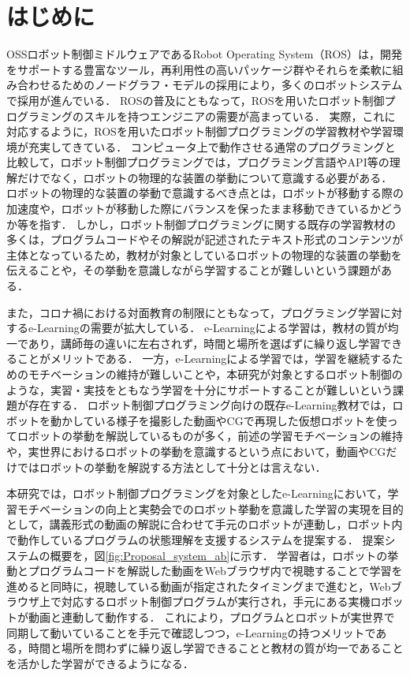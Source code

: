 \documentclass{ujarticle}
\begin{document}
\section{はじめに}%
OSSロボット制御ミドルウェアであるRobot Operating System（ROS）は，開発をサポートする豊富なツール，再利用性の高いパッケージ群やそれらを柔軟に組み合わせるためのノードグラフ・モデルの採用により，多くのロボットシステムで採用が進んでいる．
ROSの普及にともなって，ROSを用いたロボット制御プログラミングのスキルを持つエンジニアの需要が高まっている．
実際，これに対応するように，ROSを用いたロボット制御プログラミングの学習教材や学習環境が充実してきている．
コンピュータ上で動作させる通常のプログラミングと比較して，ロボット制御プログラミングでは，プログラミング言語やAPI等の理解だけでなく，ロボットの物理的な装置の挙動について意識する必要がある．
ロボットの物理的な装置の挙動で意識するべき点とは，ロボットが移動する際の加速度や，ロボットが移動した際にバランスを保ったまま移動できているかどうか等を指す．
しかし，ロボット制御プログラミングに関する既存の学習教材の多くは，プログラムコードやその解説が記述されたテキスト形式のコンテンツが主体となっているため，教材が対象としているロボットの物理的な装置の挙動を伝えることや，その挙動を意識しながら学習することが難しいという課題がある．
\par また，コロナ禍における対面教育の制限にともなって，プログラミング学習に対するe-Learningの需要が拡大している．
e-Learningによる学習は，教材の質が均一であり，講師毎の違いに左右されず，時間と場所を選ばずに繰り返し学習できることがメリットである．
一方，e-Learningによる学習では，学習を継続するためのモチベーションの維持が難しいことや，本研究が対象とするロボット制御のような，実習・実技をともなう学習を十分にサポートすることが難しいという課題が存在する．
ロボット制御プログラミング向けの既存e-Learning教材では，ロボットを動かしている様子を撮影した動画やCGで再現した仮想ロボットを使ってロボットの挙動を解説しているものが多く，前述の学習モチベーションの維持や，実世界におけるロボットの挙動を意識するという点において，動画やCGだけではロボットの挙動を解説する方法として十分とは言えない．
\par 本研究では，ロボット制御プログラミングを対象としたe-Learningにおいて，学習モチベーションの向上と実勢会でのロボット挙動を意識した学習の実現を目的として，講義形式の動画の解説に合わせて手元のロボットが連動し，ロボット内で動作しているプログラムの状態理解を支援するシステムを提案する．
提案システムの概要を，図\ref{fig:Proposal_system_ab}に示す．
学習者は，ロボットの挙動とプログラムコードを解説した動画をWebブラウザ内で視聴することで学習を進めると同時に，視聴している動画が指定されたタイミングまで進むと，Webブラウザ上で対応するロボット制御プログラムが実行され，手元にある実機ロボットが動画と連動して動作する．
これにより，プログラムとロボットが実世界で同期して動いていることを手元で確認しつつ，e-Learningの持つメリットである，時間と場所を問わずに繰り返し学習できることと教材の質が均一であることを活かした学習ができるようになる．
\end{document}
